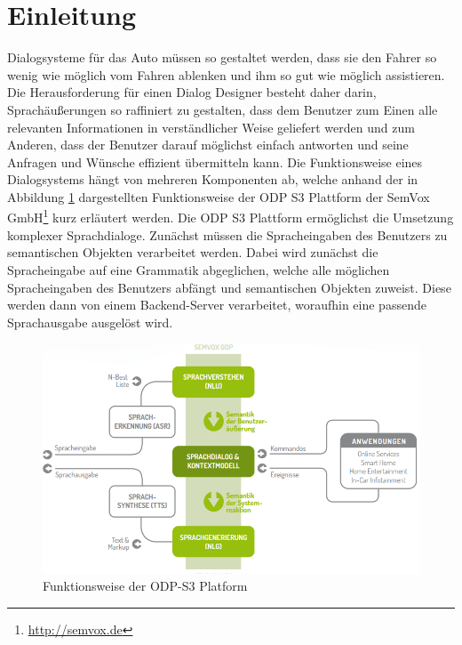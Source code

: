 \documentclass[12pt,a4paper]{scrartcl}
\begin{document}
\section{Einleitung}

Dialogsysteme für das Auto müssen so gestaltet werden, dass sie den Fahrer so wenig wie möglich vom Fahren ablenken und ihm so gut wie möglich assistieren. Die Herausforderung für einen Dialog Designer besteht daher darin, Sprachäußerungen so raffiniert zu gestalten, dass dem Benutzer zum Einen alle relevanten Informationen in verständlicher Weise geliefert werden und zum Anderen, dass der Benutzer darauf möglichst einfach antworten und seine Anfragen und Wünsche effizient übermitteln kann. Die Funktionsweise eines Dialogsystems hängt von mehreren Komponenten ab, welche anhand der in Abbildung \ref{odps3} dargestellten Funktionsweise der ODP S3 Plattform der SemVox GmbH\footnote{\label{foot:odps3}\url{http://semvox.de}} kurz erläutert werden. Die ODP S3 Plattform ermöglichst die Umsetzung komplexer Sprachdialoge.  
Zunächst müssen die Spracheingaben des Benutzers zu semantischen Objekten verarbeitet werden. Dabei wird zunächst die Spracheingabe auf eine Grammatik abgeglichen, welche alle möglichen Spracheingaben des Benutzers abfängt und semantischen Objekten zuweist. Diese werden dann von einem Backend-Server verarbeitet, woraufhin eine passende Sprachausgabe ausgelöst wird. 
\begin{figure}[htbp]
\begin{center}
\includegraphics[width=12cm]{odps3.png}
\caption{Funktionsweise der ODP-S3 Platform}
\label{odps3}
\end{center}
\end{figure}
\end{document}
